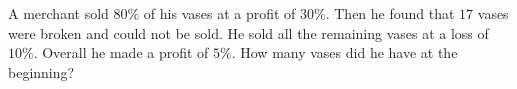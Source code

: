 A merchant sold $80\%$ of his vases at a profit of $30\%$. Then he found that $17$ vases were broken and could not be sold. He sold all the remaining vases at a loss of $10\%$. Overall he made a profit of $5\%$. How many vases did he have at the beginning?
